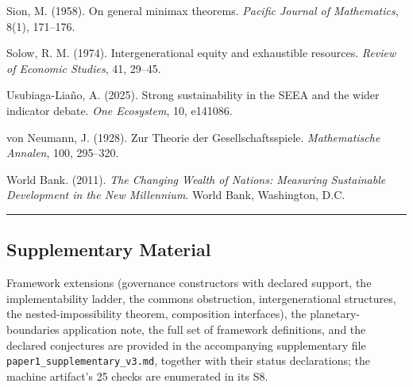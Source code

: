 \documentclass[11pt]{article}
\begin{document}
Sion, M. (1958). On general minimax theorems. \emph{Pacific Journal of
Mathematics}, 8(1), 171--176.

Solow, R. M. (1974). Intergenerational equity and exhaustible resources.
\emph{Review of Economic Studies}, 41, 29--45.

Usubiaga-Lia\~no, A. (2025). Strong sustainability in the SEEA and the
wider indicator debate. \emph{One Ecosystem}, 10, e141086.

von Neumann, J. (1928). Zur Theorie der Gesellschaftsspiele.
\emph{Mathematische Annalen}, 100, 295--320.

World Bank. (2011). \emph{The Changing Wealth of Nations: Measuring
Sustainable Development in the New Millennium}. World Bank, Washington,
D.C.

\begin{center}\rule{0.5\linewidth}{0.5pt}\end{center}

\subsection{Supplementary Material}\label{supplementary-material}

Framework extensions (governance constructors with declared support, the
implementability ladder, the commons obstruction, intergenerational
structures, the nested-impossibility theorem, composition interfaces),
the planetary-boundaries application note, the full set of framework
definitions, and the declared conjectures are provided in the
accompanying supplementary file \texttt{paper1\_supplementary\_v3.md},
together with their status declarations; the machine artifact's 25
checks are enumerated in its S8.
\end{document}
